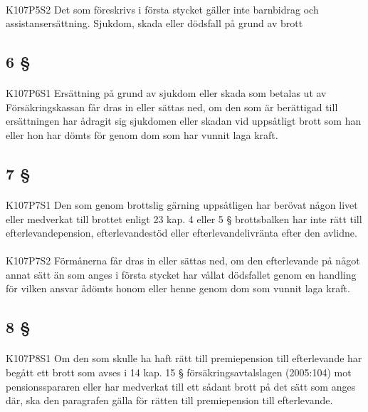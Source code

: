 \documentclass[a4paper,notitlepage,openany,10pt]{book}
\begin{document}
\paragraph*{}
{\tiny K107P5S2}
Det som föreskrivs i första stycket gäller inte barnbidrag och assistansersättning.
Sjukdom, skada eller dödsfall på grund av brott
\subsection*{6 §}
\paragraph*{}
{\tiny K107P6S1}
Ersättning på grund av sjukdom eller skada som betalas ut av Försäkringskassan får dras in eller sättas ned, om den som är berättigad till ersättningen har ådragit sig sjukdomen eller skadan vid uppsåtligt brott som han eller hon har dömts för genom dom som har vunnit laga kraft.
\subsection*{7 §}
\paragraph*{}
{\tiny K107P7S1}
Den som genom brottslig gärning uppsåtligen har berövat någon livet eller medverkat till brottet enligt 23 kap. 4 eller 5 § brottsbalken har inte rätt till efterlevandepension, efterlevandestöd eller efterlevandelivränta efter den avlidne.
\paragraph*{}
{\tiny K107P7S2}
Förmånerna får dras in eller sättas ned, om den efterlevande på något annat sätt än som anges i första stycket har vållat dödsfallet genom en handling för vilken ansvar ådömts honom eller henne genom dom som vunnit laga kraft.
\subsection*{8 §}
\paragraph*{}
{\tiny K107P8S1}
Om den som skulle ha haft rätt till premiepension till efterlevande har begått ett brott som avses i 14 kap. 15 § försäkringsavtalslagen (2005:104) mot pensionsspararen eller har medverkat till ett sådant brott på det sätt som anges där, ska den paragrafen gälla för rätten till premiepension till efterlevande.
\end{document}
